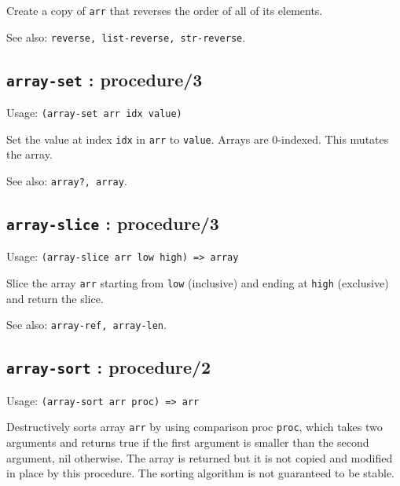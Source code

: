 \documentclass[
]{article}
\newcommand{\passthrough}[1]{#1}
\begin{document}
Create a copy of \passthrough{\lstinline!arr!} that reverses the order
of all of its elements.

See also: \passthrough{\lstinline!reverse, list-reverse, str-reverse!}.

\hypertarget{array-set-procedure3-1}{%
\subsection{\texorpdfstring{\texttt{array-set} :
procedure/3}{array-set : procedure/3}}\label{array-set-procedure3-1}}

Usage: \passthrough{\lstinline!(array-set arr idx value)!}

Set the value at index \passthrough{\lstinline!idx!} in
\passthrough{\lstinline!arr!} to \passthrough{\lstinline!value!}. Arrays
are 0-indexed. This mutates the array.

See also: \passthrough{\lstinline!array?, array!}.

\hypertarget{array-slice-procedure3-1}{%
\subsection{\texorpdfstring{\texttt{array-slice} :
procedure/3}{array-slice : procedure/3}}\label{array-slice-procedure3-1}}

Usage: \passthrough{\lstinline!(array-slice arr low high) => array!}

Slice the array \passthrough{\lstinline!arr!} starting from
\passthrough{\lstinline!low!} (inclusive) and ending at
\passthrough{\lstinline!high!} (exclusive) and return the slice.

See also: \passthrough{\lstinline!array-ref, array-len!}.

\hypertarget{array-sort-procedure2-1}{%
\subsection{\texorpdfstring{\texttt{array-sort} :
procedure/2}{array-sort : procedure/2}}\label{array-sort-procedure2-1}}

Usage: \passthrough{\lstinline!(array-sort arr proc) => arr!}

Destructively sorts array \passthrough{\lstinline!arr!} by using
comparison proc \passthrough{\lstinline!proc!}, which takes two
arguments and returns true if the first argument is smaller than the
second argument, nil otherwise. The array is returned but it is not
copied and modified in place by this procedure. The sorting algorithm is
not guaranteed to be stable.
\end{document}
